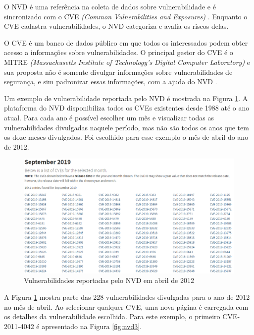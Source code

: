 O NVD é uma referência na coleta de dados sobre vulnerabilidade e é sincronizado com o CVE \textit{(Common Vulnerabilities and Exposures)} \cite{CVE1985}. Enquanto o CVE cadastra vulnerabilidades, o NVD categoriza e avalia os riscos delas. 

O CVE é um  banco de dados público em que todos os interessados podem obter acesso a informações sobre vulnerabilidades. O principal gestor do CVE é o MITRE \textit{(Massachusetts Institute of Technology's Digital Computer Laboratory)} e sua proposta não é somente divulgar informações sobre vulnerabilidades de segurança, e sim padronizar essas informações, com a ajuda do NVD \cite{Peotta2006}. 

Um exemplo de vulnerabilidade reportada pelo NVD é mostrada na Figura \ref{fig:nvd1}. A plataforma do NVD disponibiliza todos os CVEs existentes desde 1988 até o ano atual. Para cada ano é possível escolher um mês e visualizar todas as vulnerabilidades divulgadas naquele período, mas não são todos os anos que tem os doze meses divulgados. Foi escolhido para esse exemplo o mês de abril do ano de 2012. 

\begin{figure}[H]
\centering
\includegraphics[width=1\textwidth]{imagens/nvd_exemplo1.png}
\caption{Vulnerabilidades reportadas pelo NVD em abril de 2012}
\label{fig:nvd1}
\end{figure}

A Figura \ref{fig:nvd1} mostra parte das 228 vulnerabilidades divulgadas para o ano de 2012 no mês de abril. Ao selecionar qualquer CVE, uma nova página é carregada com os detalhes da vulnerabilidade escolhida. Para este exemplo, o primeiro CVE-2011-4042 é apresentado na Figura \ref{fig:nvd3}.

